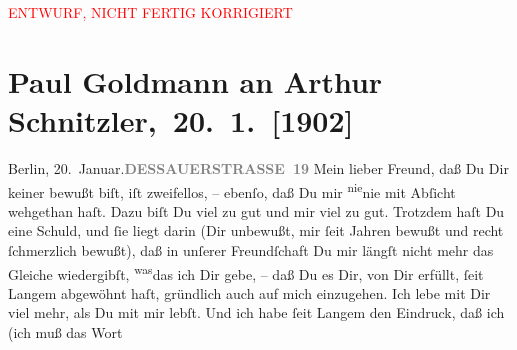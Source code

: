 
\begin{center}
            \textcolor{red}{ENTWURF, NICHT FERTIG KORRIGIERT}
                      \end{center}
            
         
         \renewcommand{\erwaehntePersonen}{Personen: Gerhart Hauptmann}
         \renewcommand{\erwaehnteOrte}{Orte: Berlin, Dessauer Straße, Wien}
         \renewcommand{\erwaehnteWerke}{Werke: Berliner Theater. »Einsame Menschen« im Deutschen Theater}
               \section[ Paul Goldmann an Arthur Schnitzler, 20. 1. {[}1902{]}]{ Paul Goldmann an Arthur Schnitzler, 20. 1. {[}1902{]}}\nopagebreak{}\rehead{ }\begin{ledgroupsized}[t]{13cm}\normalsize\beginnumbering \toendnotes[C]{\smallbreak\pagebreak[2]} 
\toendnotes[C]{\smallbreak}\pstart
           \noindent{}{\pb}Berlin, 20. Januar.\hfill \textcolor{gray}{\textbf{DESSAUERSTRASSE 19}}\pend
           \pstart
           Mein lieber Freund, daß Du Dir keiner \label{K_L03194-1v}\label{K_L03194-1h} bewußt biſt, iſt zweifellos, – ebenſo, daß Du mir \substVorne{}\textsuperscript{nie}\substDazwischen{}nie\substHinten{} mit Abſicht wehgethan haſt. Dazu biſt Du viel zu gut und mir viel zu gut.
                   Trotzdem haſt Du eine Schuld, und ſie liegt darin (Dir unbewußt, mir ſeit
               Jahren bewußt und recht ſchmerzlich bewußt), daß in unſerer Freundſchaft Du mir
               längſt nicht mehr das Gleiche wiedergibſt, \substVorne{}\textsuperscript{was}\substDazwischen{}das\substHinten{} ich Dir gebe, – daß Du  es Dir, von Dir erfüllt, ſeit Langem abgewöhnt haſt, \strikeout{\textcolor{gray}{a}} gründlich auch auf mich einzugehen. Ich lebe mit Dir viel mehr, als Du
               mit mir lebſt. Und ich habe ſeit Langem den Eindruck, daß ich (ich muß das Wort

\end{ledgroupsized}
